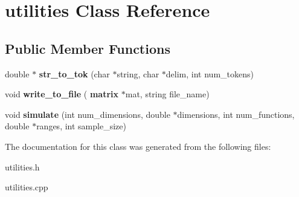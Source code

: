 \section{utilities Class Reference}
\label{classutilities}
\subsection*{Public Member Functions}
\begin{DoxyCompactItemize}
\item 
\mbox{\label{classutilities_a72504733e9384ade61daaa0e5b55ed32}} 
double $\ast$ {\bfseries str\+\_\+to\+\_\+tok} (char $\ast$string, char $\ast$delim, int num\+\_\+tokens)
\item 
\mbox{\label{classutilities_a0fac2805e79a2a19e520ef69b5b13bcd}} 
void {\bfseries write\+\_\+to\+\_\+file} (\textbf{ matrix} $\ast$mat, string file\+\_\+name)
\item 
\mbox{\label{classutilities_a440ebef57004db18af104d4d2a162e1f}} 
void {\bfseries simulate} (int num\+\_\+dimensions, double $\ast$dimensions, int num\+\_\+functions, double $\ast$ranges, int sample\+\_\+size)
\end{DoxyCompactItemize}


The documentation for this class was generated from the following files\+:\begin{DoxyCompactItemize}
\item 
utilities.\+h\item 
utilities.\+cpp\end{DoxyCompactItemize}
